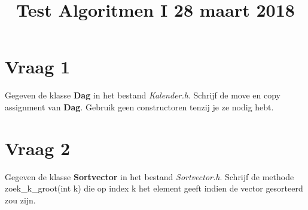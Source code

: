 \documentclass{article}
\begin{document}
\title{Test Algoritmen I 28 maart 2018}
\date{}
\author{}
\maketitle

\section{Vraag 1}
    Gegeven de klasse \textbf{Dag} in het bestand \textit{Kalender.h}. Schrijf de move en copy assignment van \textbf{Dag}. Gebruik geen constructoren tenzij je ze nodig hebt.
\section{Vraag 2}
    Gegeven de klasse \textbf{Sortvector} in het bestand \textit{Sortvector.h}. Schrijf de methode zoek\_k\_groot(int k) die op index k het element geeft indien de vector gesorteerd zou zijn.
\end{document}
